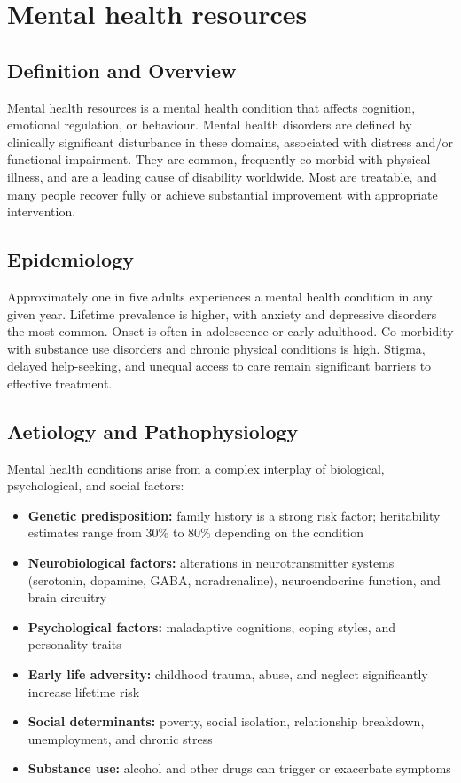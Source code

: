 \chapter{Mental health resources}

\section*{Definition and Overview}
Mental health resources is a mental health condition that affects cognition, emotional regulation, or behaviour. Mental health disorders are defined by clinically significant disturbance in these domains, associated with distress and/or functional impairment. They are common, frequently co-morbid with physical illness, and are a leading cause of disability worldwide. Most are treatable, and many people recover fully or achieve substantial improvement with appropriate intervention.

\section*{Epidemiology}
Approximately one in five adults experiences a mental health condition in any given year. Lifetime prevalence is higher, with anxiety and depressive disorders the most common. Onset is often in adolescence or early adulthood. Co-morbidity with substance use disorders and chronic physical conditions is high. Stigma, delayed help-seeking, and unequal access to care remain significant barriers to effective treatment.

\section*{Aetiology and Pathophysiology}
Mental health conditions arise from a complex interplay of biological, psychological, and social factors:

\begin{itemize}
    \item \textbf{Genetic predisposition:} family history is a strong risk factor; heritability estimates range from 30\% to 80\% depending on the condition
    \item \textbf{Neurobiological factors:} alterations in neurotransmitter systems (serotonin, dopamine, GABA, noradrenaline), neuroendocrine function, and brain circuitry
    \item \textbf{Psychological factors:} maladaptive cognitions, coping styles, and personality traits
    \item \textbf{Early life adversity:} childhood trauma, abuse, and neglect significantly increase lifetime risk
    \item \textbf{Social determinants:} poverty, social isolation, relationship breakdown, unemployment, and chronic stress
    \item \textbf{Substance use:} alcohol and other drugs can trigger or exacerbate symptoms
\end{itemize}

